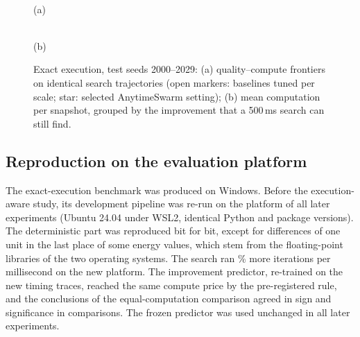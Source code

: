 \begin{figure}[t]
\centering
\begin{minipage}[b]{0.62\linewidth}\centering{}\\[-1pt]{\small (a)}\end{minipage}\hfill
\begin{minipage}[b]{0.36\linewidth}\centering{}\\[-1pt]{\small (b)}\end{minipage}
\caption{Exact execution, test seeds 2000--2029: (a) quality--compute frontiers on identical search trajectories (open
markers: baselines tuned per scale; star: selected AnytimeSwarm setting); (b) mean computation per snapshot, grouped by
the improvement that a 500\,ms search can still find.}\label{fig:static}
\end{figure}

\subsection{Reproduction on the evaluation platform}\label{sec:repro}
The exact-execution benchmark was produced on Windows. Before the execution-aware study, its development pipeline was
re-run on the platform of all later experiments (Ubuntu 24.04 under WSL2, identical Python and package versions). The
deterministic part was reproduced bit for bit, except for differences of one unit in the last place of some energy
values, which stem from the floating-point libraries of the two operating systems. The search ran
\% more iterations per millisecond on the new platform. The improvement predictor, re-trained on the
new timing traces, reached the same compute price by the pre-registered rule, and the conclusions of the
equal-computation comparison agreed in sign and significance in  comparisons. The frozen predictor
was used unchanged in all later experiments.

